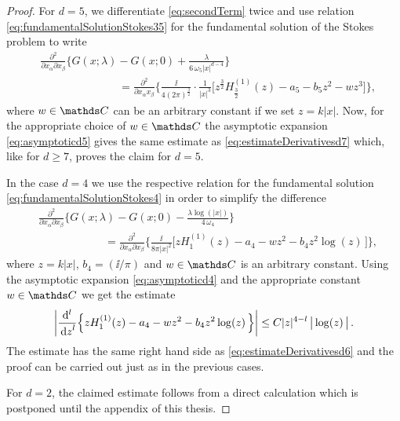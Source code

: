 \begin{proof}
For $d = 5$, we differentiate \eqref{eq:secondTerm} twice and use relation \eqref{eq:fundamentalSolutionStokes35} for the fundamental solution of the Stokes problem to  write
\begin{align*}
  &\frac{\partial^2}{\partial x_\alpha \partial x_\beta} \bigg\{ G(x; \lambda) - G(x; 0) + \frac{\lambda}{6\, \omega_5 |x|^{d - 4}} \bigg\} \\
  &\hspace{3cm}= \frac{\partial^2}{\partial x_\alpha x_\beta} \bigg\{ \frac{\ii}{4(2\pi)^{\frac{3}{2}}} \cdot \frac{1}{|x|^3} \Big[ z^{\frac{3}{2}} H_{\frac{3}{2}}^{(1)}(z) - a_5 - b_5 z^2 - w z^3 \Big] \bigg\},
\end{align*}
where $w\in\C$ can be an arbitrary constant if we set $z = k|x|$.
Now, for the appropriate choice of $w \in \C$ the asymptotic expansion \eqref{eq:asymptoticd5} gives the same estimate as \eqref{eq:estimateDerivativesd7} which, like for $d \geq 7$, proves the claim for $d = 5$.

In the case $d = 4$ we use the respective relation for the fundamental solution \eqref{eq:fundamentalSolutionStokes4} in order to simplify the difference
\begin{align*}
  & \frac{\partial^2}{\partial x_\alpha \partial x_\beta} \bigg\{ G(x; \lambda) - G(x; 0) - \frac{\lambda \log(|x|)}{4\, \omega_4} \bigg\} \\
  &\qquad\qquad\qquad= \frac{\partial^2}{\partial x_\alpha \partial x_\beta} \bigg\{ \frac{\ii}{8 \pi |x|^2} \Big[ z H_1^{(1)}(z) - a_4 - w z^2 - b_4 z^2 \log(z)\,\Big] \bigg\},
\end{align*}
where $z = k |x|$, $b_4 = ({\ii}/{\pi})$ and $w \in \C$ is an arbitrary constant. Using the asymptotic expansion \eqref{eq:asymptoticd4} and the appropriate constant $w \in \C$ we get the estimate
\begin{align*}
  \bigg| \frac{\mathrm{d}^l}{\, {\operatorname{d}\!{z}}^l} \Big\{ z H_1^{(1)}(z) - a_4 - w z^2 - b_4 z^2 \log(z)\, \Big\} \bigg| \leq C |z|^{4 - l}\, \big|\log(z)\,\big|\,.
\end{align*}
The estimate has the same right hand side as \eqref{eq:estimateDerivativesd6} and the proof can be carried out just as in the previous cases.

For $d = 2$, the claimed estimate follows from a direct calculation which is postponed until the appendix of this thesis.
\end{proof}

